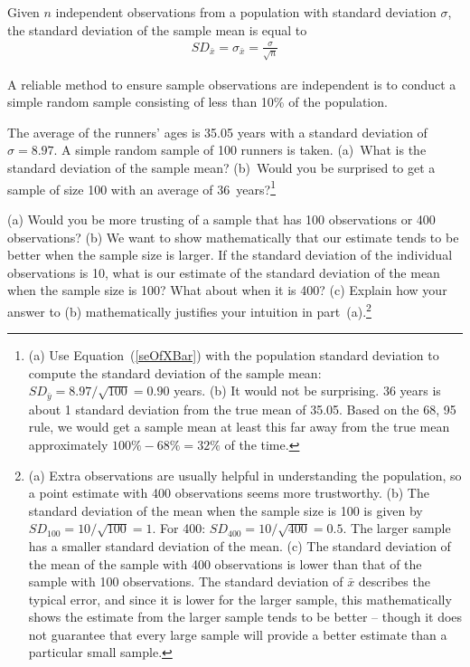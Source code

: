 \begin{termBox}{
Given $n$ independent observations from a population with standard deviation $\sigma$, the standard deviation of the sample mean is equal to \vspace{-1mm}
\begin{eqnarray}
SD_{\bar{x}} = \sigma_{\bar{x}} =  \frac{\sigma}{\sqrt{n}}
\label{seOfXBar}
\end{eqnarray}\vspace{-3mm}

A reliable method to ensure sample observations are independent is to conduct a simple random sample consisting of less than 10\% of the population.}
\end{termBox}

\begin{exercise}
The average of the runners' ages is 35.05 years with a standard deviation of $\sigma = 8.97$. A simple random sample of 100 runners is taken. (a)~What is the standard deviation of the sample mean? (b)~Would you be surprised to get a sample of size 100 with an average of 36~years?\footnote{(a) Use Equation~(\ref{seOfXBar}) with the population standard deviation to compute the standard deviation of the sample mean: $SD_{\bar{y}} = 8.97/\sqrt{100} = 0.90$ years. (b) It would not be surprising. 36 years is about 1 standard deviation from the true mean of 35.05. Based on the 68, 95 rule, we would get a sample mean at least this far away from the true mean approximately $100\% - 68\% = 32\%$ of the time.}
\end{exercise}

\textA{\newpage}

\begin{exercise}
(a) Would you be more trusting of a sample that has 100 observations or 400 observations? (b) We want to show mathematically that our estimate tends to be better when the sample size is larger. If the standard deviation of the individual observations is 10, what is our estimate of the standard deviation of the mean when the sample size is 100? What about when it is 400? (c) Explain how your answer to (b) mathematically justifies your intuition in part~(a).\footnote{(a) Extra observations are usually helpful in understanding the population, so a point estimate with 400 observations seems more trustworthy. (b) The standard deviation of the mean when the sample size is 100 is given by $SD_{100} = 10/\sqrt{100} = 1$. For 400: $SD_{400} = 10/\sqrt{400} = 0.5$. The larger sample has a smaller standard deviation of the mean. (c) The standard deviation of the mean of the sample with 400 observations is lower than that of the sample with 100 observations. The standard deviation of $\bar{x}$ describes the typical error, and since it is lower for the larger sample, this mathematically shows the estimate from the larger sample tends to be better -- though it does not guarantee that every large sample will provide a better estimate than a particular small sample.}
\end{exercise}


